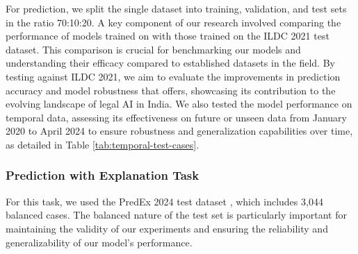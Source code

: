 For prediction, we split the \texttt{\named} single dataset into training, validation, and test sets in the ratio 70:10:20. A key component of our research involved comparing the performance of models trained on \texttt{\named} with those trained on the ILDC 2021 \cite{malik-etal-2021-ildc} test dataset. This comparison is crucial for benchmarking our models and understanding their efficacy compared to established datasets in the field. By testing against ILDC 2021, we aim to evaluate the improvements in prediction accuracy and model robustness that \texttt{\named} offers, showcasing its contribution to the evolving landscape of legal AI in India.
We also tested the model performance on temporal data, assessing its effectiveness on future or unseen data from January 2020 to April 2024 to ensure robustness and generalization capabilities over time, as detailed in Table \ref{tab:temporal-test-cases}.


\begin{table}[t]
\centering
{}
\caption{Statistics of temporal test data (January 2020 -- April 2024) across different courts for evaluation.}
\label{tab:temporal-test-cases}
\end{table}

\subsubsection{Prediction with Explanation Task}
For this task, we used the PredEx 2024 test dataset \cite{nigam2024legaljudgmentreimaginedpredex}, which includes 3,044 balanced cases. The balanced nature of the test set is particularly important for maintaining the validity of our experiments and ensuring the reliability and generalizability of our model's performance.

